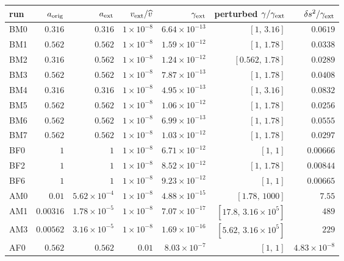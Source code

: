 \begin{table}[p]

\centering\footnotesize\setlength{\tabcolsep}{4pt}

\begin{tabular}{@{}lrrrrrr@{}}
\toprule
run & $a_{\rm orig}$ & $a_{\rm ext}$ & $v_{\rm ext}/\widehat v$ & $\gamma_{\rm ext}$ & perturbed $\gamma/\gamma_{\rm ext}$ & $\delta s^2/\gamma_{\rm ext}$ \\
\midrule
BM0 & $0.316$ & $0.316$ & $1\!\times\!10^{-8}$ & $6.64\!\times\!10^{-13}$ & $[1,\,3.16]$ & $0.0619$ \\
BM1 & $0.562$ & $0.562$ & $1\!\times\!10^{-8}$ & $1.59\!\times\!10^{-12}$ & $[1,\,1.78]$ & $0.0338$ \\
BM2 & $0.316$ & $0.562$ & $1\!\times\!10^{-8}$ & $1.24\!\times\!10^{-12}$ & $[0.562,\,1.78]$ & $0.0289$ \\
BM3 & $0.562$ & $0.562$ & $1\!\times\!10^{-8}$ & $7.87\!\times\!10^{-13}$ & $[1,\,1.78]$ & $0.0408$ \\
BM4 & $0.316$ & $0.316$ & $1\!\times\!10^{-8}$ & $4.95\!\times\!10^{-13}$ & $[1,\,3.16]$ & $0.0832$ \\
BM5 & $0.562$ & $0.562$ & $1\!\times\!10^{-8}$ & $1.06\!\times\!10^{-12}$ & $[1,\,1.78]$ & $0.0256$ \\
BM6 & $0.562$ & $0.562$ & $1\!\times\!10^{-8}$ & $6.99\!\times\!10^{-13}$ & $[1,\,1.78]$ & $0.0555$ \\
BM7 & $0.562$ & $0.562$ & $1\!\times\!10^{-8}$ & $1.03\!\times\!10^{-12}$ & $[1,\,1.78]$ & $0.0297$ \\
BF0 & $1$ & $1$ & $1\!\times\!10^{-8}$ & $6.71\!\times\!10^{-12}$ & $[1,\,1]$ & $0.00666$ \\
BF2 & $1$ & $1$ & $1\!\times\!10^{-8}$ & $8.52\!\times\!10^{-12}$ & $[1,\,1.78]$ & $0.00844$ \\
BF6 & $1$ & $1$ & $1\!\times\!10^{-8}$ & $9.23\!\times\!10^{-12}$ & $[1,\,1]$ & $0.00665$ \\
AM0 & $0.01$ & $5.62\!\times\!10^{-4}$ & $1\!\times\!10^{-8}$ & $4.88\!\times\!10^{-15}$ & $[1.78,\,1000]$ & $7.55$ \\
AM1 & $0.00316$ & $1.78\!\times\!10^{-5}$ & $1\!\times\!10^{-8}$ & $7.07\!\times\!10^{-17}$ & $[17.8,\,3.16\!\times\!10^{5}]$ & $489$ \\
AM3 & $0.00562$ & $3.16\!\times\!10^{-5}$ & $1\!\times\!10^{-8}$ & $1.69\!\times\!10^{-16}$ & $[5.62,\,3.16\!\times\!10^{5}]$ & $229$ \\
AF0 & $0.562$ & $0.562$ & $0.01$ & $8.03\!\times\!10^{-7}$ & $[1,\,1]$ & $4.83\!\times\!10^{-8}$ \\

\end{tabular}
\end{table}
